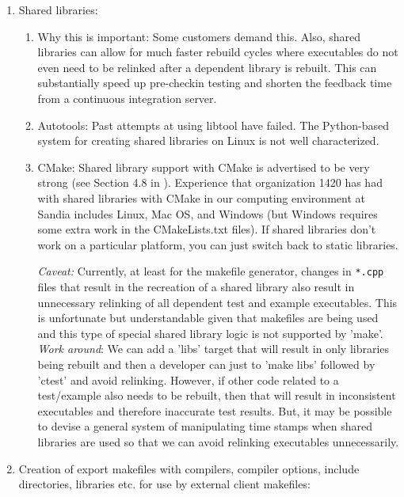 \documentclass[pdf,ps2pdf,11pt]{SANDreport}
\begin{document}
\begin{enumerate}

{}\item Shared libraries:

  \begin{enumerate}

  {}\item Why this is important: Some customers demand this.  Also,
  shared libraries can allow for much faster rebuild cycles where
  executables do not even need to be relinked after a dependent
  library is rebuilt.  This can substantially speed up pre-checkin
  testing and shorten the feedback time from a continuous integration
  server.

  {}\item Autotools: Past attempts at using libtool have failed.  The
  Python-based system for creating shared libraries on Linux is not
  well characterized.

  {}\item CMake: Shared library support with CMake is advertised to be
  very strong (see Section 4.8 in {}\cite{MasteringCMake_fourth}).
  Experience that organization 1420 has had with shared libraries with
  CMake in our computing environment at Sandia includes Linux, Mac OS,
  and Windows (but Windows requires some extra work in the
  CMakeLists.txt files).  If shared libraries don't work on a
  particular platform, you can just switch back to static libraries.
  
  {}\textit{Caveat:} Currently, at least for the makefile generator,
  changes in {}\texttt{*.cpp} files that result in the recreation of a
  shared library also result in unnecessary relinking of all dependent
  test and example executables.  This is unfortunate but
  understandable given that makefiles are being used and this type of
  special shared library logic is not supported by 'make'.
  {}\textit{Work around}: We can add a 'libs' target that will result
  in only libraries being rebuilt and then a developer can just to
  'make libs' followed by 'ctest' and avoid relinking.  However, if
  other code related to a test/example also needs to be rebuilt, then
  that will result in inconsistent executables and therefore inaccurate
  test results. But, it may be possible to devise a general system of
  manipulating time stamps when shared libraries are used so that we
  can avoid relinking executables unnecessarily.

  \end{enumerate}

{}\item Creation of export makefiles with compilers, compiler options,
include directories, libraries etc. for use by external client
makefiles:


\end{enumerate}
\end{document}
